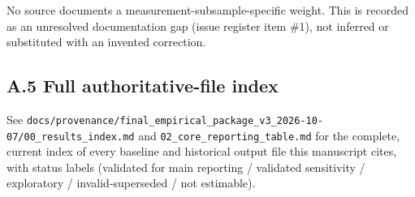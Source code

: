 No source documents a measurement-subsample-specific weight. This is recorded as an unresolved documentation gap (issue register item \#1), not inferred or substituted with an invented correction.

\subsection*{A.5 Full authoritative-file index}

See \texttt{docs/\allowbreak{}provenance/\allowbreak{}final\_\allowbreak{}empirical\_\allowbreak{}package\_\allowbreak{}v3\_\allowbreak{}2026-\allowbreak{}10-\allowbreak{}07/\allowbreak{}00\_\allowbreak{}results\_\allowbreak{}index.\allowbreak{}md} and \texttt{02\_\allowbreak{}core\_\allowbreak{}reporting\_\allowbreak{}table.\allowbreak{}md} for the complete, current index of every baseline and historical output file this manuscript cites, with status labels (validated for main reporting / validated sensitivity / exploratory / invalid-superseded / not estimable).
